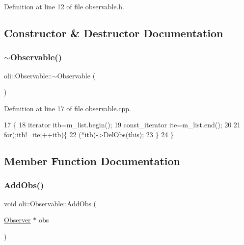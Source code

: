 Definition at line 12 of file observable.\+h.



\subsection{Constructor \& Destructor Documentation}
\hypertarget{classoli_1_1_observable_aabeb2ecf331c7ecb274594df6f4e82b1}{}\label{classoli_1_1_observable_aabeb2ecf331c7ecb274594df6f4e82b1} 
\subsubsection{\texorpdfstring{$\sim$\+Observable()}{~Observable()}}
{\footnotesize\ttfamily oli\+::\+Observable\+::$\sim$\+Observable (\begin{DoxyParamCaption}{ }\end{DoxyParamCaption})\hspace{0.3cm}{\ttfamily [virtual]}}



Definition at line 17 of file observable.\+cpp.


\begin{DoxyCode}
17                        \{
18     iterator itb=m\_list.begin();
19     const\_iterator ite=m\_list.end();
20 
21     \textcolor{keywordflow}{for}(;itb!=ite;++itb)\{
22         (*itb)->DelObs(\textcolor{keyword}{this});
23     \}
24 \}
\end{DoxyCode}


\subsection{Member Function Documentation}
\hypertarget{classoli_1_1_observable_af746a8f49e2b08bc93767281dd813532}{}\label{classoli_1_1_observable_af746a8f49e2b08bc93767281dd813532} 
\subsubsection{\texorpdfstring{Add\+Obs()}{AddObs()}}
{\footnotesize\ttfamily void oli\+::\+Observable\+::\+Add\+Obs (\begin{DoxyParamCaption}\item[{\hyperlink{classoli_1_1_observer}{Observer} $\ast$}]{obs }\end{DoxyParamCaption})}




